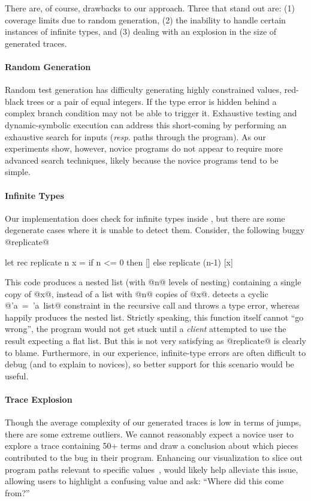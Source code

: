 There are, of course, drawbacks to our approach. Three that stand out
are: (1) coverage limits due to random generation, (2) the inability to
handle certain instances of infinite types, and (3) dealing with an
explosion in the size of generated traces.

\paragraph{Random Generation}
Random test generation has difficulty generating highly constrained
values, \eg red-black trees or a pair of equal integers. If the type
error is hidden behind a complex branch condition \nanomaly may not be
able to trigger it. Exhaustive testing and dynamic-symbolic execution
can address this short-coming by performing an exhaustive search for
inputs (\emph{resp}. paths through the program). As our experiments
show, however, novice programs do not appear to require more advanced
search techniques, likely because the novice programs tend to be simple.

\paragraph{Infinite Types}
Our implementation does check for infinite types inside \forcesym, but
there are some degenerate cases where it is unable to detect
them. Consider, the following buggy @replicate@
%
\begin{code}
  let rec replicate n x =
    if n <= 0 then []
              else replicate (n-1) [x]
\end{code}
%
This code produces a nested list (with @n@ levels of nesting) containing
a single copy of @x@, instead of a list with @n@ copies of @x@. \ocaml
detects a cyclic \hbox{@'a = 'a list@} constraint in the recursive call
and throws a type error, whereas \nanomaly happily %
produces the nested list.  Strictly speaking, this function itself cannot
``go wrong'', the program would not get stuck until a \emph{client}
attempted to use the result expecting a flat list. But this is not very
satisfying as @replicate@ is clearly to blame. Furthermore, in our
experience, infinite-type errors are often difficult to %
debug (and to explain to novices), so better support for this scenario
would be useful.

\paragraph{Trace Explosion}
Though the average complexity of our generated traces is low in terms of
jumps, there are some extreme outliers. We cannot reasonably expect a
novice user to explore a trace containing 50+ terms and draw a
conclusion about which pieces contributed to the bug in their
program. Enhancing our visualization to slice out program paths relevant
to specific values~\cite{perera_functional_2012},
would likely help alleviate this issue, allowing users to
highlight a confusing value and ask: ``Where did this come from?''


